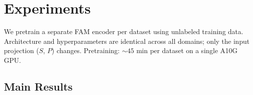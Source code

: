 \documentclass{article}
\begin{document}
\section{Experiments}
\label{sec:experiments}

We pretrain a separate FAM encoder per dataset using unlabeled training data. Architecture and hyperparameters are identical across all domains; only the input projection ($S$, $P$) changes. Pretraining: ${\sim}45$ min per dataset on a single A10G GPU.

\subsection{Main Results}
\label{sec:benchmark}
\end{document}

